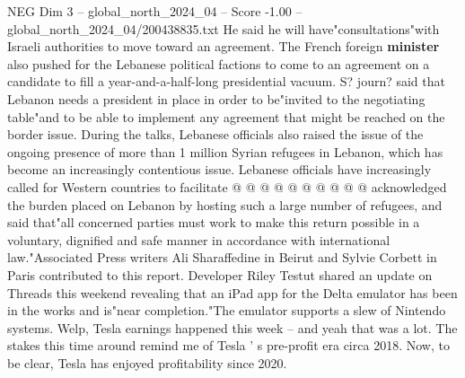 \begin{textsample}{NEG Dim 3 – global\_north\_2024\_04 – Score -1.00 – global\_north\_2024\_04/200438835.txt}
He said he will have"consultations"with Israeli authorities to move toward an agreement.
The French foreign \textbf{minister} also pushed for the Lebanese political factions to come to an agreement on a candidate to fill a year-and-a-half-long presidential vacuum.
S? journ? said that Lebanon needs a president in place in order to be"invited to the negotiating table"and to be able to implement any agreement that might be reached on the border issue.
During the talks, Lebanese officials also raised the issue of the ongoing presence of more than 1 million Syrian refugees in Lebanon, which has become an increasingly contentious issue.
Lebanese officials have increasingly called for Western countries to facilitate @ @ @ @ @ @ @ @ @ @ acknowledged the burden placed on Lebanon by hosting such a large number of refugees, and said that"all concerned parties must work to make this return possible in a voluntary, dignified and safe manner in accordance with international law."Associated Press writers Ali Sharaffedine in Beirut and Sylvie Corbett in Paris contributed to this report.
Developer Riley Testut shared an update on Threads this weekend revealing that an iPad app for the Delta emulator has been in the works and is"near completion."The emulator supports a slew of Nintendo systems.
Welp, Tesla earnings happened this week -- and yeah that was a lot.
The stakes this time around remind me of Tesla ' s pre-profit era circa 2018.
Now, to be clear, Tesla has enjoyed profitability since 2020.

\end{textsample}
